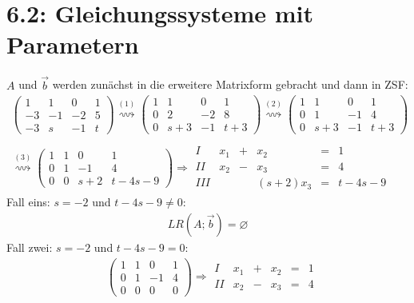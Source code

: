 \documentclass[titlepage]{article}
\begin{document}
	\section*{6.2: Gleichungssysteme mit Parametern}
	$A$ und $\vec{b}$ werden zunächst in die erweitere Matrixform gebracht und dann in ZSF:
		\begin{align*}
			\left(\begin{array}{ccc|c}
				1&1&0&1\\
				-3&-1&-2&5\\
				-3&s&-1&t
			\end{array}\right)
			\overset{(1)}{\rightsquigarrow}
			\left(\begin{array}{ccc|c}
				1&1&0&1\\
				0&2&-2&8\\
				0&s+3&-1&t+3
			\end{array}\right)
			\overset{(2)}{\rightsquigarrow}
			\left(\begin{array}{ccc|c}
				1&1&0&1\\
				0&1&-1&4\\
				0&s+3&-1&t+3
			\end{array}\right)\\\\
			\overset{(3)}{\rightsquigarrow}
			\left(\begin{array}{ccc|c}
				1&1&0&1\\
				0&1&-1&4\\
				0&0&s+2&t-4s-9
			\end{array}\right)
			\Rightarrow
			\begin{array}{cccccc}
				I&x_1&+&x_2&=&1\\
				II&x_2&-&x_3&=&4\\
				III&&&(s+2)x_3&=&t-4s-9
			\end{array}
		\end{align*}
	Fall eins: $s=-2$ und $t-4s-9\neq0$:
	\begin{align*}
		LR(A;\vec{b})=\varnothing
	\end{align*}
	Fall zwei: $s=-2$ und $t-4s-9=0$:
	\begin{align*}
		&\left(\begin{array}{ccc|c}
			1&1&0&1\\
			0&1&-1&4\\
			0&0&0&0
		\end{array}\right)
		\Rightarrow
		\begin{matrix}
			I&x_1&+&x_2&=&1\\
			II&x_2&-&x_3&=&4
		\end{matrix}
	\end{align*}
\end{document}
